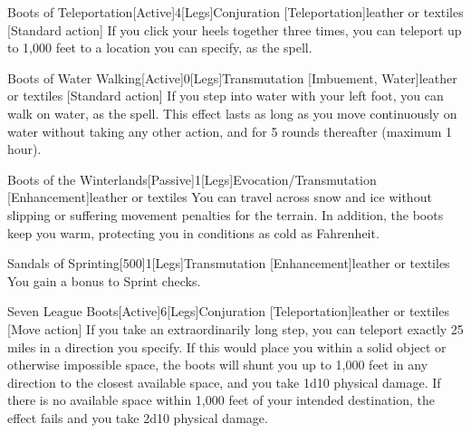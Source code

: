         \begin{magicitemdef}{Boots of Teleportation}[Active]{4}[Legs]{Conjuration [Teleportation]}{leather or textiles}
            [Standard action] If you click your heels together three times, you can teleport up to 1,000 feet to a location you can specify, as the  spell.
        \end{magicitemdef}

        \begin{magicitemdef}{Boots of Water Walking}[Active]{0}[Legs]{Transmutation [Imbuement, Water]}{leather or textiles}
            [Standard action] If you step into water with your left foot, you can walk on water, as the  spell.
            This effect lasts as long as you move continuously on water without taking any other action, and for 5 rounds thereafter (maximum 1 hour).
        \end{magicitemdef}

        \begin{magicitemdef}{Boots of the Winterlands}[Passive]{1}[Legs]{Evocation/Transmutation [Enhancement]}{leather or textiles}
             You can travel across snow and ice without slipping or suffering movement penalties for the terrain.
            In addition, the boots keep you warm, protecting you in conditions as cold as  Fahrenheit.
        \end{magicitemdef}

        \begin{magicitemdef}{Sandals of Sprinting}[500]{1}[Legs]{Transmutation [Enhancement]}{leather or textiles}
             You gain a  bonus to Sprint checks.
        \end{magicitemdef}

        \begin{magicitemdef}{Seven League Boots}[Active]{6}[Legs]{Conjuration [Teleportation]}{leather or textiles}
            [Move action] If you take an extraordinarily long step, you can teleport exactly 25 miles in a direction you specify.
            If this would place you within a solid object or otherwise impossible space, the boots will shunt you up to 1,000 feet in any direction to the closest available space, and you take 1d10 physical damage.
            If there is no available space within 1,000 feet of your intended destination, the effect fails and you take 2d10 physical damage.
        \end{magicitemdef}


